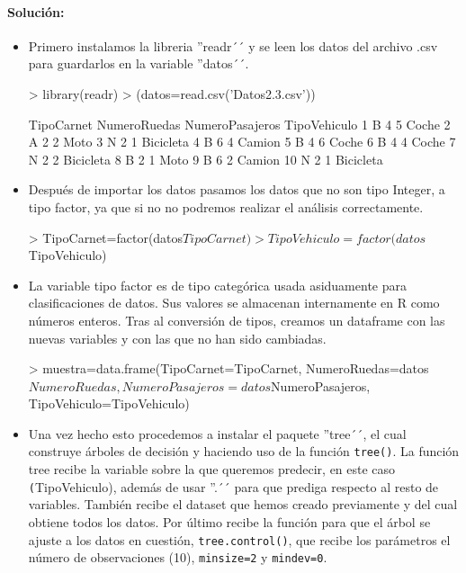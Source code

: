 \documentclass[a4paper, 12pt]{article}
\begin{document}
	\paragraph{Solución:}
	\begin{itemize}
		\item Primero instalamos la libreria ''readr´´ y se leen los datos del archivo .csv para guardarlos en la variable ''datos´´.
\begin{Schunk}
\begin{Sinput}
> library(readr)
> (datos=read.csv('Datos2.3.csv'))
\end{Sinput}
\begin{Soutput}
   TipoCarnet NumeroRuedas NumeroPasajeros TipoVehiculo
1           B            4               5        Coche
2           A            2               2         Moto
3           N            2               1    Bicicleta
4           B            6               4       Camion
5           B            4               6        Coche
6           B            4               4        Coche
7           N            2               2    Bicicleta
8           B            2               1         Moto
9           B            6               2       Camion
10          N            2               1    Bicicleta
\end{Soutput}
\end{Schunk}
		\item Después de importar los datos pasamos los datos que no son tipo Integer, a tipo factor, ya que si no no podremos realizar el análisis correctamente.
\begin{Schunk}
\begin{Sinput}
> TipoCarnet=factor(datos$TipoCarnet)
> TipoVehiculo=factor(datos$TipoVehiculo)
\end{Sinput}
\end{Schunk}
		\item La variable tipo factor es de tipo categórica usada asiduamente para clasificaciones de datos. Sus valores se almacenan internamente en R como números enteros. Tras al conversión de tipos, creamos un dataframe con las nuevas variables y con las que no han sido cambiadas.
\begin{Schunk}
\begin{Sinput}
> muestra=data.frame(TipoCarnet=TipoCarnet, NumeroRuedas=datos$NumeroRuedas, NumeroPasajeros=datos$NumeroPasajeros, TipoVehiculo=TipoVehiculo)
\end{Sinput}
\end{Schunk}
    \item Una vez hecho esto procedemos a instalar el paquete ''tree´´, el cual construye árboles de decisión y haciendo uso de la función \texttt{tree()}. La función tree recibe la variable sobre la que queremos predecir, en este caso \texttt(TipoVehiculo), además de usar ''.´´ para que prediga respecto al resto de variables. También recibe el dataset que hemos creado previamente y del cual obtiene todos los datos. Por último recibe la función para que el árbol se ajuste a los datos en cuestión, \texttt{tree.control()}, que recibe los parámetros el número de observaciones (10), \texttt{minsize=2} y \texttt{mindev=0}.

\end{itemize}
\end{document}
